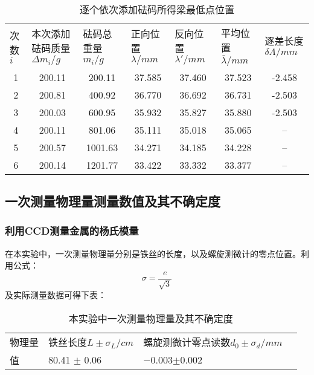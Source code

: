 \documentclass{ctexart}
\begin{document}
\begin{table}[H]
  \centering
  \caption{逐个依次添加砝码所得梁最低点位置}
  \resizebox{\textwidth}{!}
  {
    \begin{tabular}{ccccccc}
    \multicolumn{1}{l}{次数 $i$} & \multicolumn{1}{l}{本次添加砝码质量 $\Delta m_i /g$} & \multicolumn{1}{l}{砝码总重量 $m_i /g$} & \multicolumn{1}{l}{正向位置 $\lambda /mm$} & \multicolumn{1}{l}{反向位置$\lambda '/mm$} & \multicolumn{1}{l}{平均位置 $\bar{\lambda}/mm$} & \multicolumn{1}{l}{逐差长度 $\delta \Lambda/mm$} \\
    1     & 200.11 & 200.11 & 37.585 & 37.460 & 37.523 & -2.458  \\
    2     & 200.81 & 400.92  & 36.770 & 36.692 & 36.731 & -2.503  \\
    3     & 200.03 & 600.95  & 35.932 & 35.827 & 35.880 & -2.503  \\
    4     & 200.11 & 801.06  & 35.111 & 35.018 & 35.065 & -- \\
    5     & 200.57 & 1001.63  & 34.271 & 34.185 & 34.228 & -- \\
    6     & 200.14 & 1201.77  & 33.422 & 33.332 & 33.377 & -- \\
    \end{tabular}%
  }
  \label{tab:addlabel}%
\end{table}%
\subsection{一次测量物理量测量数值及其不确定度}
\subsubsection{利用CCD测量金属的杨氏模量}
在本实验中，一次测量物理量分别是铁丝的长度，以及螺旋测微计的零点位置。利用公式：
$$\sigma=\frac{e}{\sqrt{3}}$$
及实际测量数据可得下表：
\begin{table}[H]
  \centering
  \caption{本实验中一次测量物理量及其不确定度}
  
    \begin{tabular}{lllr}
    物理量   & 铁丝长度$L \pm \sigma_L /cm$ & 螺旋测微计零点读数$d_0 \pm \sigma_d /mm$ &  \\
    值     & 80.41 $\pm$ 0.06 & $-$0.003$\pm$0.002 &  \\
    \end{tabular}%
  \label{tab:addlabel}%
\end{table}%
\end{document}
